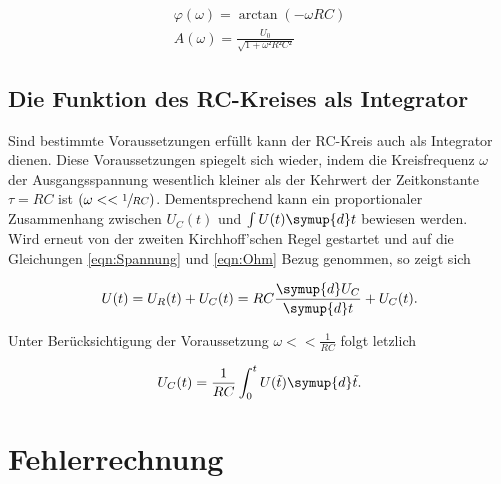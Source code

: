 \begin{gather}
    \varphi(\omega) = \arctan(-\omega RC)\\
    A(\omega) = \frac{U_0}{\sqrt{1 + \omega²R²C²}}
\end{gather}

\subsection{Die Funktion des RC-Kreises als Integrator}

Sind bestimmte Voraussetzungen erfüllt kann der RC-Kreis auch als Integrator dienen. Diese Voraussetzungen spiegelt sich wieder,
indem die Kreisfrequenz $\omega$ der Ausgangsspannung wesentlich kleiner als der Kehrwert der Zeitkonstante $\tau = RC$ ist $(\omega << \sfrac{1}{RC})$.
Dementsprechend kann ein proportionaler Zusammenhang zwischen $U_C(t)$ und $\int U(t)\symup{d}t$ bewiesen werden.\\
Wird erneut von der zweiten Kirchhoff'schen Regel gestartet und auf die Gleichungen \eqref{eqn:Spannung} und \eqref{eqn:Ohm} Bezug genommen, so zeigt sich

\begin{equation}
    U(t) = U_R(t) + U_C(t) = RC\frac{\symup{d}U_C}{\symup{d}t} + U_C(t).
\end{equation}

\noindent Unter Berücksichtigung der Voraussetzung $\omega << \frac{1}{RC}$ folgt letzlich

\begin{equation}
    U_C(t) = \frac{1}{RC}\int_0^t U(\tilde{t})\symup{d}\tilde{t}.
\end{equation}



\section{Fehlerrechnung}
